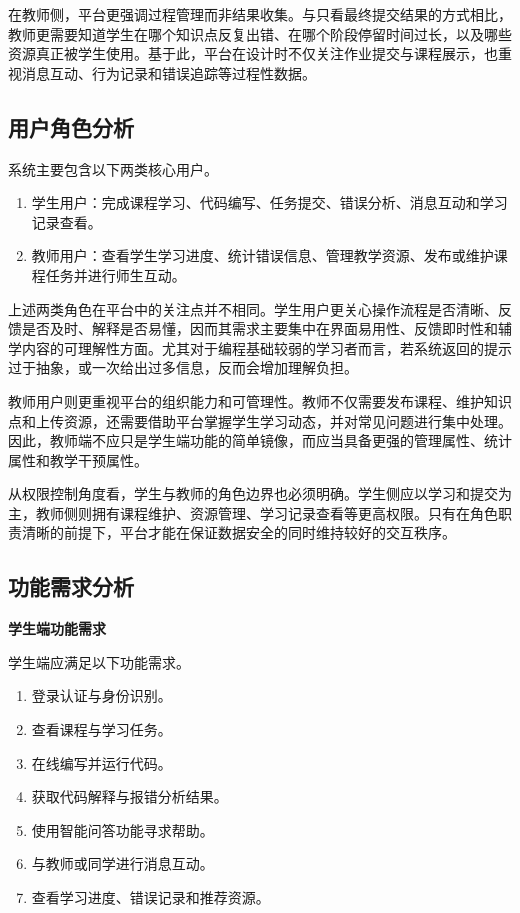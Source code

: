 在教师侧，平台更强调过程管理而非结果收集。与只看最终提交结果的方式相比，教师更需要知道学生在哪个知识点反复出错、在哪个阶段停留时间过长，以及哪些资源真正被学生使用。基于此，平台在设计时不仅关注作业提交与课程展示，也重视消息互动、行为记录和错误追踪等过程性数据。

\subsection{用户角色分析}
系统主要包含以下两类核心用户。
\begin{enumerate}
  \item 学生用户：完成课程学习、代码编写、任务提交、错误分析、消息互动和学习记录查看。
  \item 教师用户：查看学生学习进度、统计错误信息、管理教学资源、发布或维护课程任务并进行师生互动。
\end{enumerate}

上述两类角色在平台中的关注点并不相同。学生用户更关心操作流程是否清晰、反馈是否及时、解释是否易懂，因而其需求主要集中在界面易用性、反馈即时性和辅学内容的可理解性方面。尤其对于编程基础较弱的学习者而言，若系统返回的提示过于抽象，或一次给出过多信息，反而会增加理解负担\cite{yan2025collaborative}。

教师用户则更重视平台的组织能力和可管理性。教师不仅需要发布课程、维护知识点和上传资源，还需要借助平台掌握学生学习动态，并对常见问题进行集中处理。因此，教师端不应只是学生端功能的简单镜像，而应当具备更强的管理属性、统计属性和教学干预属性。

从权限控制角度看，学生与教师的角色边界也必须明确。学生侧应以学习和提交为主，教师侧则拥有课程维护、资源管理、学习记录查看等更高权限。只有在角色职责清晰的前提下，平台才能在保证数据安全的同时维持较好的交互秩序。

\subsection{功能需求分析}
\textbf{学生端功能需求}

学生端应满足以下功能需求。
\begin{enumerate}
  \item 登录认证与身份识别。
  \item 查看课程与学习任务。
  \item 在线编写并运行代码。
  \item 获取代码解释与报错分析结果。
  \item 使用智能问答功能寻求帮助。
  \item 与教师或同学进行消息互动。
  \item 查看学习进度、错误记录和推荐资源。
\end{enumerate}

